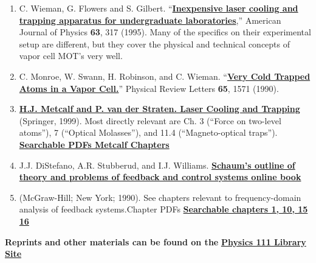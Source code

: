 \documentclass{../lab}
\begin{document}
\begin{enumerate}
    \item C. Wieman, G. Flowers and S. Gilbert. ``\href{http://physics111.lib.berkeley.edu/Physics111/Reprints/MOT/MOT\_Plans.pdf}{\textbf{Inexpensive laser cooling and trapping apparatus for undergraduate laboratories}},'' American Journal of Physics \textbf{63}, 317 (1995). Many of the specifics on their experimental setup are different, but they cover the physical and technical concepts of vapor cell MOT's very well.

    \item C. Monroe, W. Swann, H. Robinson, and C. Wieman. ``\href{http://physics111.lib.berkeley.edu/Physics111/Reprints/MOT/Very\%20Cold\%20Trapped\%20Atoms\%20in\%20a\%20Vapor\%20Cell_PhysRevLett.65.1571.pdf}{\textbf{Very Cold Trapped Atoms in a Vapor Cell.}}'' Physical Review Letters \textbf{65}, 1571 (1990). 

    \item \href{http://books.google.com/books?id=hDJPnSFh-g0C&dq=H.J.+Metcalf+and+P.+van+der+Straeten.+Laser+Cooling+and+Trapping+book&printsec=frontcover&source=bn&hl=en&ei=jMWaS4eRD4TuswPgytidAg&sa=X&oi=book\_result&ct=result&resnum=4&ved=0CBAQ6AEwAw#v=onepage&q=&f=false}{\textbf{H.J. Metcalf and P. van der Straten. Laser Cooling and Trapping}} (Springer, 1999). Most directly relevant are Ch. 3 (``Force on two-level atoms''), 7 (``Optical Molasses''), and 11.4 (``Magneto-optical traps''). \href{http://physics111.lib.berkeley.edu/Physics111/Reprints/MOT/Laser\_Cooling\_and\_Trapping\_HJ\_Metcalf/}{\textbf{Searchable PDFs Metcalf Chapters}}

    \item J.J. DiStefano, A.R. Stubberud, and I.J. Williams. \href{http://physics111.lib.berkeley.edu/Physics111/Reprints/MOT/Schaum's\%20Outline\%20Theory\%20and\%20Problems\%20of\%20Feedback\%20and\%20Control\%20Systems/}{\textbf{Schaum’s outline of theory and problems of feedback and control systems online book}}

    \item (McGraw-Hill; New York; 1990). See chapters relevant to frequency-domain analysis of feedback systems.Chapter PDFs \href{http://physics111.lib.berkeley.edu/Physics111/Reprints/MOT/Schaum's\%20Outline\%20Theory\%20and\%20Problems\%20of\%20Feedback\%20and\%20Control\%20Systems/}{\textbf{Searchable chapters 1, 10, 15 16}}
\end{enumerate}

\textbf{Reprints and other materials can be found on the} \href{http://physics111.lib.berkeley.edu/Physics111/Reprints/MOT/MOT\_index.html}{\textbf{Physics 111 Library Site}}
\end{document}

